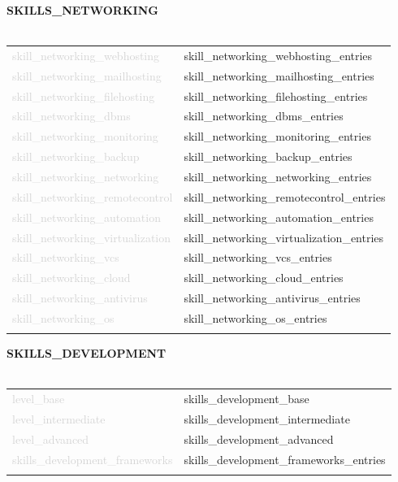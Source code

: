 \documentclass{article}
\begin{document}
\textbf{\textcolor{deepblue}{\uppercase{{{skills_networking}}}}} \\\\ \hfill
\begin{tabular}{ R{4cm} L{11cm} }
	\textcolor{lightgray}{{{skill_networking_webhosting}}} & {{skill_networking_webhosting_entries}} \\ \hfill
	\textcolor{lightgray}{{{skill_networking_mailhosting}}} & {{skill_networking_mailhosting_entries}} \\ \hfill
	\textcolor{lightgray}{{{skill_networking_filehosting}}} & {{skill_networking_filehosting_entries}} \\ \hfill
	\textcolor{lightgray}{{{skill_networking_dbms}}} & {{skill_networking_dbms_entries}} \\ \hfill
	\textcolor{lightgray}{{{skill_networking_monitoring}}} & {{skill_networking_monitoring_entries}} \\ \hfill
	\textcolor{lightgray}{{{skill_networking_backup}}} & {{skill_networking_backup_entries}} \\ \hfill
	\textcolor{lightgray}{{{skill_networking_networking}}} & {{skill_networking_networking_entries}} \\ \hfill
	\textcolor{lightgray}{{{skill_networking_remotecontrol}}} & {{skill_networking_remotecontrol_entries}} \\ \hfill
	\textcolor{lightgray}{{{skill_networking_automation}}} & {{skill_networking_automation_entries}} \\ \hfill
	\textcolor{lightgray}{{{skill_networking_virtualization}}} & {{skill_networking_virtualization_entries}} \\ \hfill
	\textcolor{lightgray}{{{skill_networking_vcs}}} & {{skill_networking_vcs_entries}} \\ \hfill
	\textcolor{lightgray}{{{skill_networking_cloud}}} & {{skill_networking_cloud_entries}} \\ \hfill
	\textcolor{lightgray}{{{skill_networking_antivirus}}} & {{skill_networking_antivirus_entries}} \\ \hfill
	\textcolor{lightgray}{{{skill_networking_os}}} & {{skill_networking_os_entries}} \\ \hfill
\end{tabular}

\textbf{\textcolor{deepblue}{\uppercase{{{skills_development}}}}} \\\\ \hfill
\begin{tabular}{ R{4cm} L{11cm} }
	\textcolor{lightgray}{{{level_base}}} & {{skills_development_base}} \\ \hfill
	\textcolor{lightgray}{{{level_intermediate}}} & {{skills_development_intermediate}} \\ \hfill
	\textcolor{lightgray}{{{level_advanced}}} & {{skills_development_advanced}} \\[.5cm] \hfill
	\textcolor{lightgray}{{{skills_development_frameworks}}} & {{skills_development_frameworks_entries}} \\ \hfill
\end{tabular}
\end{document}
